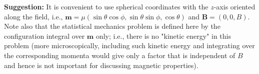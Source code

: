 \documentclass{article}
\begin{document}
\textbf{Suggestion:} It is convenient to use spherical coordinates with the $z$-axis oriented along the field, i.e., $\mathbf{m} = \mu(\sin \theta \cos \phi, \sin \theta \sin \phi, \cos \theta)$ and $\mathbf{B} = (0, 0, B)$. Note also that the statistical mechanics problem is defined here by the configuration integral over $\mathbf{m}$ only; i.e., there is no "kinetic energy" in this problem (more microscopically, including such kinetic energy and integrating over the corresponding momenta would give only a factor that is independent of $B$ and hence is not important for discussing magnetic properties).
\end{document}
